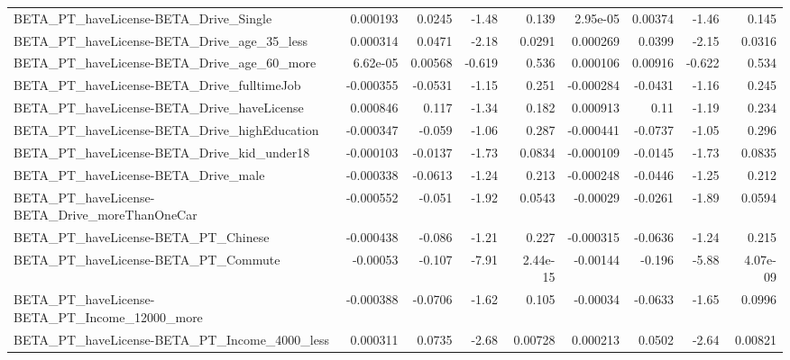 \begin{tabular}{lrrrrrrrr}
BETA\_PT\_haveLicense-BETA\_Drive\_Single              &    0.000193 &       0.0245 &    -1.48 &    0.139 &   2.95e-05 &     0.00374 &        -1.46 &         0.145 \\
BETA\_PT\_haveLicense-BETA\_Drive\_age\_35\_less         &    0.000314 &       0.0471 &    -2.18 &   0.0291 &   0.000269 &      0.0399 &        -2.15 &        0.0316 \\
BETA\_PT\_haveLicense-BETA\_Drive\_age\_60\_more         &    6.62e-05 &      0.00568 &   -0.619 &    0.536 &   0.000106 &     0.00916 &       -0.622 &         0.534 \\
BETA\_PT\_haveLicense-BETA\_Drive\_fulltimeJob         &   -0.000355 &      -0.0531 &    -1.15 &    0.251 &  -0.000284 &     -0.0431 &        -1.16 &         0.245 \\
BETA\_PT\_haveLicense-BETA\_Drive\_haveLicense         &    0.000846 &        0.117 &    -1.34 &    0.182 &   0.000913 &        0.11 &        -1.19 &         0.234 \\
BETA\_PT\_haveLicense-BETA\_Drive\_highEducation       &   -0.000347 &       -0.059 &    -1.06 &    0.287 &  -0.000441 &     -0.0737 &        -1.05 &         0.296 \\
BETA\_PT\_haveLicense-BETA\_Drive\_kid\_under18         &   -0.000103 &      -0.0137 &    -1.73 &   0.0834 &  -0.000109 &     -0.0145 &        -1.73 &        0.0835 \\
BETA\_PT\_haveLicense-BETA\_Drive\_male                &   -0.000338 &      -0.0613 &    -1.24 &    0.213 &  -0.000248 &     -0.0446 &        -1.25 &         0.212 \\
BETA\_PT\_haveLicense-BETA\_Drive\_moreThanOneCar      &   -0.000552 &       -0.051 &    -1.92 &   0.0543 &   -0.00029 &     -0.0261 &        -1.89 &        0.0594 \\
BETA\_PT\_haveLicense-BETA\_PT\_Chinese                &   -0.000438 &       -0.086 &    -1.21 &    0.227 &  -0.000315 &     -0.0636 &        -1.24 &         0.215 \\
BETA\_PT\_haveLicense-BETA\_PT\_Commute                &    -0.00053 &       -0.107 &    -7.91 & 2.44e-15 &   -0.00144 &      -0.196 &        -5.88 &      4.07e-09 \\
BETA\_PT\_haveLicense-BETA\_PT\_Income\_12000\_more      &   -0.000388 &      -0.0706 &    -1.62 &    0.105 &   -0.00034 &     -0.0633 &        -1.65 &        0.0996 \\
BETA\_PT\_haveLicense-BETA\_PT\_Income\_4000\_less       &    0.000311 &       0.0735 &    -2.68 &  0.00728 &   0.000213 &      0.0502 &        -2.64 &       0.00821 \\

\end{tabular}
